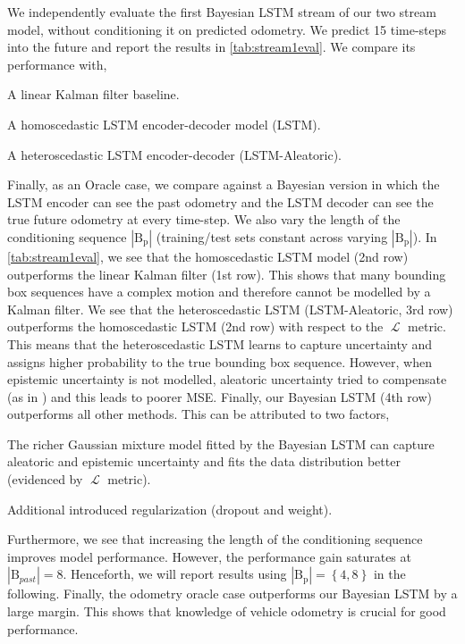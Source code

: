  We independently evaluate the first Bayesian LSTM stream of our two stream model, without conditioning it on predicted odometry. We predict 15 time-steps into the future and report the results in \autoref{tab:stream1eval}. We compare its performance with,
\begin{enumerate*}
    \item A linear Kalman filter baseline.
    \item A homoscedastic LSTM encoder-decoder model (LSTM).
    \item A heteroscedastic LSTM encoder-decoder (LSTM-Aleatoric).
\end{enumerate*}
 Finally, as an Oracle case, we compare against a Bayesian version in which the LSTM encoder can see the past odometry and the LSTM decoder can see the true future odometry at every time-step. We also vary the length of the conditioning sequence $| \text{B}_{\text{p}}|$ (training/test sets constant across varying $| \text{B}_{\text{p}}|$). In \autoref{tab:stream1eval}, we see that the homoscedastic LSTM model (2nd row) outperforms the linear Kalman filter (1st row).
 This shows that many bounding box sequences have a complex motion and therefore cannot be modelled by a Kalman filter. We see that the heteroscedastic LSTM (LSTM-Aleatoric, 3rd row) outperforms the homoscedastic LSTM (2nd row) with respect to the $\operatorname{\mathcal{L}}$ metric. This means that the heteroscedastic LSTM learns to capture uncertainty and assigns higher probability to the true bounding box sequence. However, when epistemic uncertainty is not modelled, aleatoric uncertainty tried to compensate (as in \cite{kendall2017uncertainties}) and this leads to poorer MSE. Finally, our Bayesian LSTM (4th row) outperforms all other methods. This can be attributed to two factors,  
 \begin{enumerate*}
    \item The richer Gaussian mixture model fitted by the Bayesian LSTM can capture aleatoric and epistemic uncertainty and fits the data distribution better (evidenced by $\operatorname{\mathcal{L}}$ metric).
    \item Additional introduced regularization (dropout and weight).
 \end{enumerate*}
 Furthermore, we see that increasing the length of the conditioning sequence improves model performance. However, the performance gain saturates at $| \text{B}_{past}| = 8$. Henceforth, we will report results using $| \text{B}_{\text{p}}| = \left\{4,8\right\}$ in the following. Finally, the odometry oracle case outperforms our Bayesian LSTM by a large margin. This shows that knowledge of vehicle odometry is crucial for good performance. 

